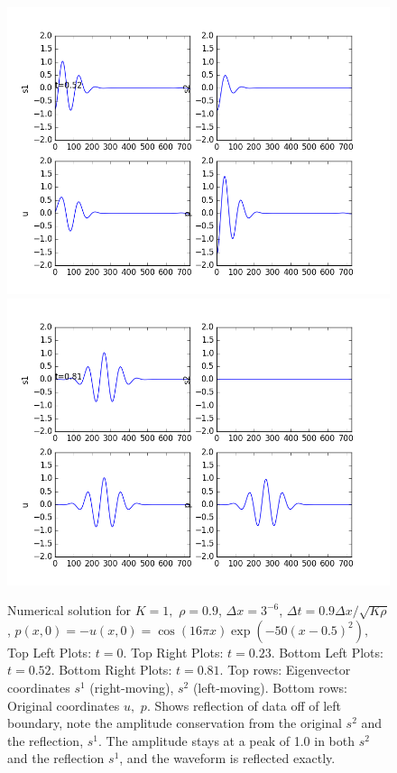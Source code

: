 \documentclass[12pt]{article}
\begin{document}
\begin{enumerate}[(a)]
\begin{figure}[H]
\centering\includegraphics[scale=0.4]{acoustic_wavepacket_frames/acoustic_eqn_fig10.png}
\centering\includegraphics[scale=0.4]{acoustic_wavepacket_frames/acoustic_eqn_fig15.png}
\caption{Numerical solution for $K=1,$ $\rho=0.9$, $\Delta x = 3^{-6}$, $\Delta t = 0.9 \Delta x / \sqrt{K \rho}$, $p(x,0) = -u(x,0)= \cos(16\pi x)\exp(-50(x-0.5)^2),$Top Left Plots: $t=0$. Top Right Plots: $t=0.23$. Bottom Left Plots: $t=0.52$. Bottom Right Plots: $t=0.81$. Top rows: Eigenvector coordinates $s^1$ (right-moving), $s^2$ (left-moving).  Bottom rows: Original coordinates $u,$ $p$. Shows reflection of data off of left boundary, note the amplitude conservation from the original $s^2$ and the reflection, $s^1$. The amplitude stays at a peak of 1.0 in both $s^2$ and the reflection $s^1$, and the waveform is reflected exactly.}

\end{figure}
\end{enumerate}
\end{document}
